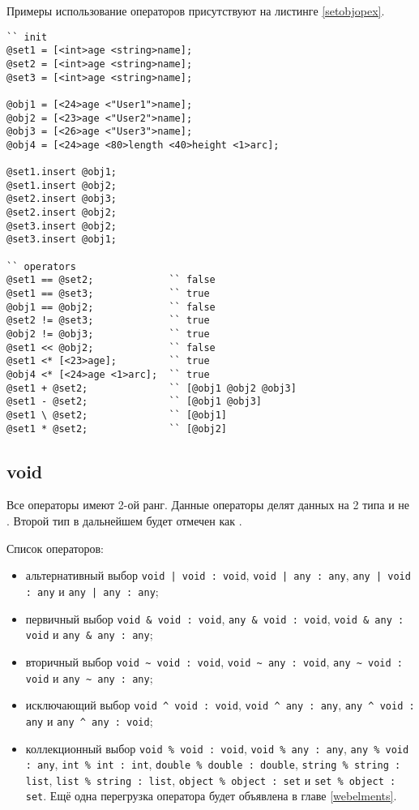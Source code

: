 \documentclass[a4paper, 14pt]{extarticle}
\newenvironment{icItems}
	{ \begin{itemize} [noitemsep,nolistsep] }
	{ \end{itemize} }
\begin{document}
	Примеры использование операторов присутствуют на листинге \ref{setobjopex}.

\begin{lstlisting}[caption=Примеры использования операторов над данными типа object и set, label=setobjopex]
`` init
@set1 = [<int>age <string>name];
@set2 = [<int>age <string>name];
@set3 = [<int>age <string>name];

@obj1 = [<24>age <"User1">name];
@obj2 = [<23>age <"User2">name];
@obj3 = [<26>age <"User3">name];
@obj4 = [<24>age <80>length <40>height <1>arc];

@set1.insert @obj1;
@set1.insert @obj2;
@set2.insert @obj3;
@set2.insert @obj2;
@set3.insert @obj2;
@set3.insert @obj1;

`` operators
@set1 == @set2;				`` false
@set1 == @set3;				`` true
@obj1 == @obj2;				`` false
@set2 != @set3;				`` true
@obj2 != @obj3;				`` true
@set1 << @obj2;				`` false
@set1 <* [<23>age];			`` true
@obj4 <* [<24>age <1>arc];	`` true
@set1 + @set2;				`` [@obj1 @obj2 @obj3]
@set1 - @set2;				`` [@obj1 @obj3]
@set1 \ @set2;				`` [@obj1]
@set1 * @set2;				`` [@obj2]
\end{lstlisting}

\subsection{\color{bluemarin}void}
	
	Все  операторы имеют 2-ой ранг. Данные операторы делят данных на 2 типа  и не . Второй тип в дальнейшем будет отмечен как .
	
	Список  операторов:
\begin{icItems}
	\item альтернативный выбор \lstinline`void | void : void`, \lstinline`void | any : any`, \lstinline`any | void : any` и \lstinline`any | any : any`;
	\item первичный выбор \lstinline`void & void : void`, \lstinline`any & void : void`, \lstinline`void & any : void` и \lstinline`any & any : any`;
	\item вторичный выбор \lstinline`void ~ void : void`, \lstinline`void ~ any : void`, \lstinline`any ~ void : void` и \lstinline`any ~ any : any`;
	\item исключающий выбор \lstinline`void ^ void : void`, \lstinline`void ^ any : any`, \lstinline`any ^ void : any` и \lstinline`any ^ any : void`;
	\item коллекционный выбор \lstinline`void % void : void`, \lstinline`void % any : any`, \lstinline`any % void : any`, \lstinline`int % int : int`, \lstinline`double % double : double`, \lstinline`string % string : list`, \lstinline`list % string : list`, \lstinline`object % object : set` и \lstinline`set % object : set`. Ещё одна перегрузка оператора будет объявлена в главе \ref{webelments}.
\end{icItems}
\end{document}
